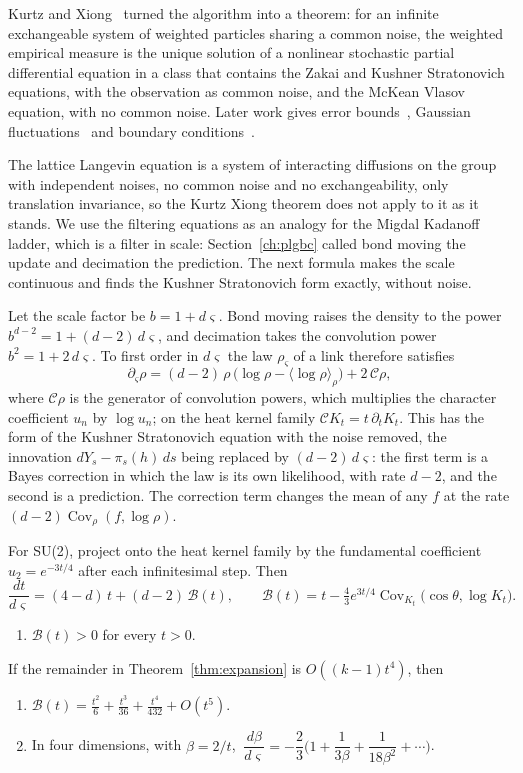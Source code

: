 Kurtz and Xiong~\cite{KX99} turned the algorithm into a theorem: for an infinite exchangeable system of weighted particles sharing a common noise, the weighted empirical measure is the unique solution of a nonlinear stochastic partial differential equation in a class that contains the Zakai and Kushner Stratonovich equations, with the observation as common noise, and the McKean Vlasov equation, with no common noise. Later work gives error bounds~\cite{KX01}, Gaussian fluctuations~\cite{KX04} and boundary conditions~\cite{CJK18}.

The lattice Langevin equation is a system of interacting diffusions on the group with independent noises, no common noise and no exchangeability, only translation invariance, so the Kurtz Xiong theorem does not apply to it as it stands. We use the filtering equations as an analogy for the Migdal Kadanoff ladder, which is a filter in scale: Section~\ref{ch:plgbc} called bond moving the update and decimation the prediction. The next formula makes the scale continuous and finds the Kushner Stratonovich form exactly, without noise.

Let the scale factor be $b=1+d\varsigma$. Bond moving raises the density to the power $b^{d-2}=1+(d-2)\,d\varsigma$, and decimation takes the convolution power $b^2=1+2\,d\varsigma$. To first order in $d\varsigma$ the law $\rho_\varsigma$ of a link therefore satisfies
\[
\partial_\varsigma\rho=(d-2)\,\rho\,\big(\log\rho-\langle\log\rho\rangle_\rho\big)+2\,\mathcal C\rho ,
\]
where $\mathcal C\rho$ is the generator of convolution powers, which multiplies the character coefficient $u_n$ by $\log u_n$; on the heat kernel family $\mathcal C K_t=t\,\partial_tK_t$. This has the form of the Kushner Stratonovich equation with the noise removed, the innovation $dY_s-\pi_s(h)\,ds$ being replaced by $(d-2)\,d\varsigma$: the first term is a Bayes correction in which the law is its own likelihood, with rate $d-2$, and the second is a prediction. The correction term changes the mean of any $f$ at the rate $(d-2)\operatorname{Cov}_\rho(f,\log\rho)$.

\begin{proposition}\label{prop:contladder}
For SU(2), project onto the heat kernel family by the fundamental coefficient $u_2=e^{-3t/4}$ after each infinitesimal step. Then
\[
\frac{dt}{d\varsigma}=(4-d)\,t+(d-2)\,\mathcal B(t),\qquad\mathcal B(t)=t-\tfrac43e^{3t/4}\operatorname{Cov}_{K_t}\!\big(\cos\theta,\log K_t\big).
\]
\begin{enumerate}
\item[(i)] $\mathcal B(t)>0$ for every $t>0$.
\end{enumerate}
If the remainder in Theorem~\ref{thm:expansion} is $O((k-1)t^4)$, then
\begin{enumerate}
\item[(ii)] $\mathcal B(t)=\frac{t^2}6+\frac{t^3}{36}+\frac{t^4}{432}+O(t^5)$.
\item[(iii)] In four dimensions, with $\beta=2/t$, $\ \dfrac{d\beta}{d\varsigma}=-\dfrac23\Big(1+\dfrac1{3\beta}+\dfrac1{18\beta^2}+\cdots\Big)$.
\end{enumerate}
\end{proposition}

